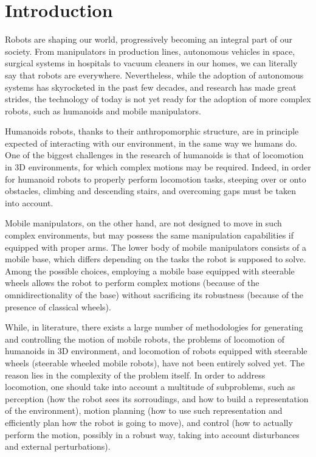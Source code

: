 \chapter{Introduction}
Robots are shaping our world, progressively becoming an integral part of our 
society. From manipulators in production lines, autonomous vehicles in 
space, surgical systems in hospitals to vacuum cleaners in our homes, we can 
literally say that robots are everywhere. Nevertheless, while the adoption of
autonomous systems has skyrocketed in the past few decades, and research has
made great strides, the technology of today
is not yet ready for the adoption of more complex robots, such as humanoids
and mobile manipulators.

Humanoids robots, thanks to their anthropomorphic structure, are in principle 
expected of interacting with our environment, in the same way we humans do.
One of the biggest challenges in the research of humanoids is that of 
locomotion in 3D environments, for which complex motions may be required.
Indeed, in order for humanoid robots to properly perform locomotion tasks, 
steeping over or onto obstacles, climbing and descending stairs, and 
overcoming gaps must be taken into account. 

Mobile manipulators, on the other hand, are not designed to move in such 
complex environments, but may possess the same manipulation capabilities if 
equipped with proper arms. The lower body of mobile manipulators consists
of a mobile base, which differs depending on the tasks the robot is
supposed to solve. Among the possible choices, employing a mobile base equipped 
with steerable wheels allows the robot to perform complex motions (because 
of the omnidirectionality of the base) without sacrificing its robustness
(because of the presence of classical wheels).

While, in literature, there exists a large number of methodologies for
generating and controlling the motion of mobile robots, the problems 
of locomotion of humanoids in 3D environment, and locomotion of robots 
equipped with steerable wheels (steerable wheeled mobile robots), have not been 
entirely solved yet. The reason lies in the complexity of the problem itself.
In order to address locomotion, one should take into account a multitude of 
subproblems, such as perception (how the robot sees its sorroudings,
and how to build a representation of the environment), motion 
planning (how to use such representation and efficiently plan how the robot 
is going to move), and control (how to actually perform the motion, possibly 
in a robust way, taking into account disturbances and external perturbations).

